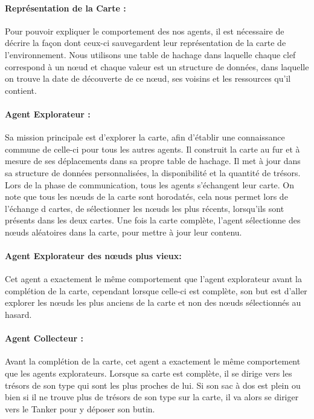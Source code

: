 \documentclass[10pt]{article}
\begin{document}
\paragraph{Représentation de la Carte :}
Pour pouvoir expliquer le comportement des nos agents, il est nécessaire de décrire la façon dont ceux-ci sauvegardent leur représentation de la carte de l'environnement. Nous utilisons une table de hachage dans laquelle chaque clef correspond à un n\oe{}ud et chaque valeur est un structure de données, dans laquelle on trouve la date de découverte de ce n\oe{}ud, ses voisins et les ressources qu'il contient.

\paragraph{Agent Explorateur :}
Sa mission principale est d'explorer la carte, afin d'établir une connaissance commune de celle-ci pour tous les  autres agents. Il construit la carte au fur et à mesure de ses déplacements dans sa propre table de hachage. Il met à jour dans sa structure de données personnalisées, la disponibilité et la quantité de trésors. Lors de la phase de communication, tous les agents s'échangent leur carte. On note que tous les n\oe{}uds de la carte sont horodatés, cela nous permet lors de l'échange d cartes, de sélectionner les n\oe{}uds les plus récents, lorsqu'ils sont présents dans les deux cartes. Une fois la carte complète, l'agent sélectionne des n\oe{}uds aléatoires dans la carte, pour mettre à jour leur contenu.

\paragraph{Agent Explorateur des n\oe{}uds plus vieux:}
Cet agent a exactement le même comportement que l'agent explorateur avant la complétion de la carte, cependant lorsque celle-ci est complète, son but est d'aller explorer les n\oe{}uds les plus anciens de la carte et non des n\oe{}uds sélectionnés au hasard.

\paragraph{Agent Collecteur :} Avant la complétion de la carte, cet agent a exactement le même comportement que les agents explorateurs. Lorsque sa carte est complète, il se dirige vers les trésors de son type qui sont les plus proches de lui. Si son sac à dos est plein ou bien si il ne trouve plus de trésors de son type sur la carte, il va alors se diriger vers le Tanker pour y déposer son butin.
\end{document}
